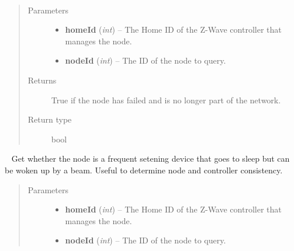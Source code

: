 \documentclass[letterpaper,10pt,english]{sphinxmanual}
\begin{document}
\begin{fulllineitems}
\begin{fulllineitems}
\end{fulllineitems}


\begin{fulllineitems}
\label{libopenzwave:libopenzwave.PyManager.isNodeFailed}~\begin{quote}\begin{description}
\item[{Parameters}] \leavevmode\begin{itemize}
\item {} 
\textbf{homeId} (\emph{int}) -- The Home ID of the Z-Wave controller that manages the node.

\item {} 
\textbf{nodeId} (\emph{int}) -- The ID of the node to query.

\end{itemize}

\item[{Returns}] \leavevmode
True if the node has failed and is no longer part of the network.

\item[{Return type}] \leavevmode
bool

\end{description}\end{quote}

\end{fulllineitems}


\begin{fulllineitems}
\label{libopenzwave:libopenzwave.PyManager.isNodeFrequentListeningDevice}~\label{libopenzwave:isnodefrequentlisteningdevice}
Get whether the node is a frequent setening device that goes to sleep but
can be woken up by a beam. Useful to determine node and controller consistency.
\begin{quote}\begin{description}
\item[{Parameters}] \leavevmode\begin{itemize}
\item {} 
\textbf{homeId} (\emph{int}) -- The Home ID of the Z-Wave controller that manages the node.

\item {} 
\textbf{nodeId} (\emph{int}) -- The ID of the node to query.


\end{itemize}
\end{description}
\end{quote}
\end{fulllineitems}
\end{fulllineitems}
\end{document}

